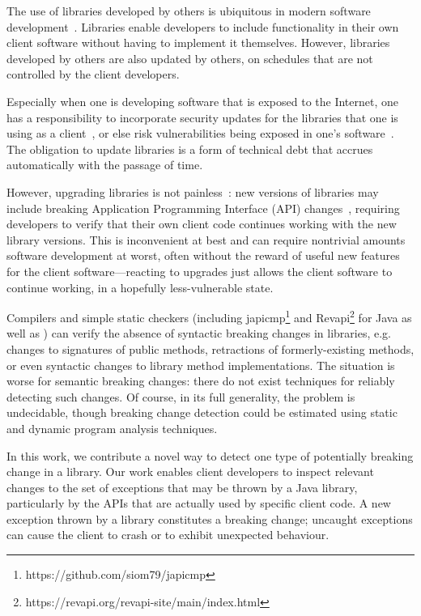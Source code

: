 The use of libraries developed by others is ubiquitous in modern
software development~\cite{huang22:_charac_java,wang20:_java}. Libraries enable developers to include
functionality in their own client software without having to
implement it themselves.  However, libraries developed by others are
also updated by others, on schedules that are not controlled by the client developers.

Especially when one is developing software that is exposed to the Internet, one
has a responsibility to incorporate security updates for the
libraries that one is using as a client~\cite{wu23:_under_threat_upstr_vulner_downs}, or else risk vulnerabilities
being exposed in one's software~\cite{haryono22:_autom_ident_librar_vulner_data,zhan21:_atvhun,alfadel23:_empir_python}. The obligation to update libraries is
a form of technical debt that accrues automatically with the passage
of time.

However, upgrading libraries is not painless~\cite{elizalde18:_towar_smoot_librar_migrat,derr17:_keep,dann23:_upcy}: new
versions of libraries may include breaking Application Programming
Interface (API) changes~\cite{dietrich14:_broken}, requiring developers to verify that their own client
code continues working with the new library versions. This is
inconvenient at best and can require nontrivial amounts software development at worst,
often without the reward of useful new features for the client software---reacting to upgrades
just allows the client software to continue working, in a hopefully less-vulnerable
state.

Compilers and simple static
checkers (including japicmp\footnote{https://github.com/siom79/japicmp} and Revapi\footnote{https://revapi.org/revapi-site/main/index.html} for Java as well as \cite{brito18:_apidif,foo18:_effic_static_check_librar_updat})
can verify the absence of syntactic breaking changes in libraries,
e.g. changes to signatures of public methods, retractions of
formerly-existing methods, or even syntactic changes to library method
implementations. The situation is worse for semantic breaking changes:
there do not exist techniques for reliably detecting such changes. Of
course, in its full generality, the problem is undecidable, though
breaking change detection could be estimated using static and dynamic program analysis
techniques.

In this work, we contribute a novel way to detect one type of potentially breaking
change in a library. Our work enables client developers to inspect relevant changes
to the set of exceptions that may be thrown by a Java library, particularly
by the APIs that are actually used by specific client code. A new exception thrown by a library
constitutes a breaking change; uncaught exceptions can cause the client to crash or
to exhibit unexpected behaviour.

